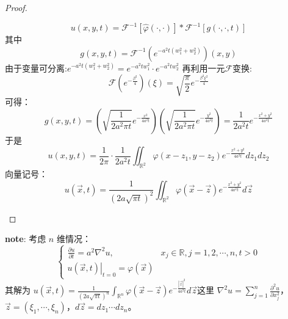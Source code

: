 \documentclass[linespread=1.5,openany]{book}%
\theoremstyle{plain}
\begin{document}
{{{\begin{proof}
\begin{itemize}
							\[	u(x,y,t)=\mathcal{F}^{-1}[\hat{\varphi}(\cdot,\cdot)]*\mathcal{F}^{-1}[g(\cdot,\cdot,t)]\]其中 \[g(x,y,t)=\mathcal{F}^{-1}\left(e^{-a^{2}t(w_{1}^{2}+w_{2}^{2})}\right)(x,y)\]
							由于变量可分离:\(e^{-a^{2}t(w_{1}^{2}+w_{2}^{2})}=e^{-a^{2}tw_{1}^{2}}\cdot e^{-a^{2}tw_{2}^{2}}\)
							再利用一元$\mathcal{F}$变换: \[\mathcal{F}\left(e^{-\frac{\beta^{2}}{4}}\right)(\xi)=\sqrt{\frac{\pi}{2}}e^{-\frac{\beta^{2}\xi^{2}}{4}}\]可得：
							\[
							g(x,y,t)=\left(\sqrt{\frac{1}{2a^{2}\pi t}}e^{-\frac{x^{2}}{4a^{2}t}}\right)\left(\sqrt{\frac{1}{2a^{2}\pi t}}e^{-\frac{y^{2}}{4a^{2}t}}\right)=\frac{1}{2a^{2}  t}e^{-\frac{x^{2}+y^{2}}{4a^{2}t}}
							\]
							于是 \[u(x,y,t)=\frac{1}{2\pi}\cdot\frac{1}{2a^{2}t}\iint_{\mathbb{R}^{2}}\varphi(x - z_{1},y - z_{2})e^{-\frac{x^{2}+y^{2}}{4a^{2}t}}dz_{1}dz_{2}\]
							向量记号：\[u(\vec{x},t)=\frac{1}{(2a\sqrt{\pi t})^{2}}\iint_{\mathbb{R}^{2}}\varphi(\vec{x}-\vec{z})e^{-\frac{x^{2}+y^2}{4a^{2}t}}d\vec{z}\]\end{itemize}
					\end{proof}
					\textbf{note}:
					考虑 \(n\) 维情况：
					\[
					\begin{cases}
						\frac{\partial u}{\partial t}=a^{2}\nabla^{2}u, & x_{j}\in\mathbb{R}, j = 1,2,\cdots,n, t>0\\
						\left.u(\vec{x},t)\right|_{t = 0}=\varphi(\vec{x})
					\end{cases}
					\]
					其解为 \(u(\vec{x},t)=\frac{1}{(2a\sqrt{\pi t})^{n}}\int_{\mathbb{R}^{n}}\varphi(\vec{x}-\vec{z})e^{-\frac{|\vec{z}|^{2}}{4a^{2}t}}d\vec{z}\)这里 \(\nabla^{2}u=\sum_{j = 1}^{n}\frac{\partial^{2}u}{\partial x_{j}^{2}}\)，\(\vec{z}=(\xi_{1},\cdots,\xi_{n})\)，\(d\vec{z}=dz_{1}\cdots dz_{n}\)。
					
}}}
\end{document}
